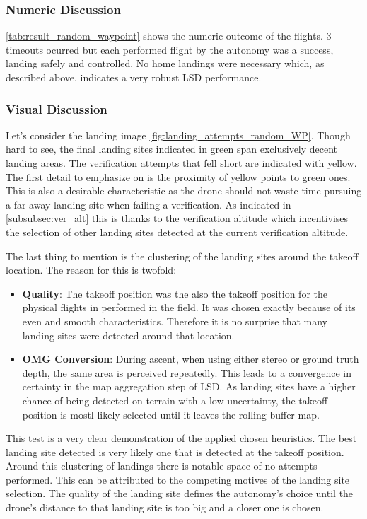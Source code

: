     \subsubsection{Numeric Discussion}
    \cref{tab:result_random_waypoint} shows the numeric outcome of the flights. 3 timeouts ocurred but each performed flight by the autonomy was a success, landing safely and controlled. No home landings were necessary which, as described above, indicates a very robust LSD performance. 

    \subsubsection{Visual Discussion}
    Let's consider the landing image \ref{fig:landing_attempts_random_WP}. Though hard to see, the final landing sites indicated in green span exclusively decent landing areas. The verification attempts that fell short are indicated with yellow. The first detail to emphasize on is the proximity of yellow points to green ones. This is also a desirable characteristic as the drone should not waste time pursuing a far away landing site when failing a verification. As indicated in \cref{subsubsec:ver_alt} this is thanks to the verification altitude which incentivises the selection of other landing sites detected at the current verification altitude.

    The last thing to mention is the clustering of the landing sites around the takeoff location. The reason for this is twofold:
    \begin{itemize}
        \item \textbf{Quality}: The takeoff position was the also the takeoff position for the physical flights in performed in the field. It was chosen exactly because of its even and smooth characteristics. Therefore it is no surprise that many landing sites were detected around that location.
        \item \textbf{OMG Conversion}: During ascent, when using either stereo or ground truth depth, the same area is perceived repeatedly. This leads to a convergence in certainty in the map aggregation step of LSD. As landing sites have a higher chance of being detected on terrain with a low uncertainty, the takeoff position is mostl likely selected until it leaves the rolling buffer map.
    \end{itemize}

    This test is a very clear demonstration of the applied chosen heuristics. The best landing site detected is very likely one that is detected at the takeoff position. Around this clustering of landings there is notable space of no attempts performed. This can be attributed to the competing motives of the landing site selection. The quality of the landing site defines the autonomy's choice until the drone's distance to that landing site is too big and a closer one is chosen. 

